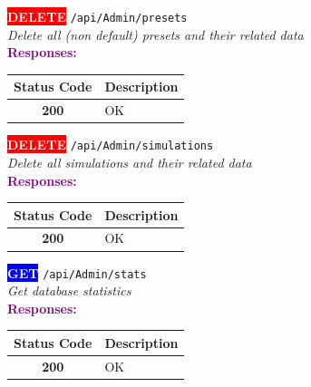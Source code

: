 \begin{tcolorbox}[
    colback=red!5,
    colframe=red,
    arc=2mm,
    boxrule=1pt,
    left=5pt,
    right=5pt,
    top=5pt,
    bottom=5pt
]
\noindent\colorbox{red}{\textcolor{white}{\textbf{DELETE}}} 
\texttt{\large /api/Admin/presets}\\[0.3em]
\textit{Delete all (non default) presets and their related data}\\[0.3em]
\vspace{0.3em}
\textbf{\textcolor{purple}{Responses:}}\\[0.2em]
\begin{tabular}{|c|p{10cm}|}
\hline
\rowcolor{gray!20}
\textbf{Status Code} & \textbf{Description} \\ \hline
\colorbox{green!20}{\textbf{200}} & OK \\ \hline
\end{tabular}
\end{tcolorbox}
\vspace{0.5em}

\begin{tcolorbox}[
    colback=red!5,
    colframe=red,
    arc=2mm,
    boxrule=1pt,
    left=5pt,
    right=5pt,
    top=5pt,
    bottom=5pt
]
\noindent\colorbox{red}{\textcolor{white}{\textbf{DELETE}}} 
\texttt{\large /api/Admin/simulations}\\[0.3em]
\textit{Delete all simulations and their related data}\\[0.3em]
\vspace{0.3em}
\textbf{\textcolor{purple}{Responses:}}\\[0.2em]
\begin{tabular}{|c|p{10cm}|}
\hline
\rowcolor{gray!20}
\textbf{Status Code} & \textbf{Description} \\ \hline
\colorbox{green!20}{\textbf{200}} & OK \\ \hline
\end{tabular}
\end{tcolorbox}
\vspace{0.5em}

\begin{tcolorbox}[
    colback=blue!5,
    colframe=blue,
    arc=2mm,
    boxrule=1pt,
    left=5pt,
    right=5pt,
    top=5pt,
    bottom=5pt
]
\noindent\colorbox{blue}{\textcolor{white}{\textbf{GET}}} 
\texttt{\large /api/Admin/stats}\\[0.3em]
\textit{Get database statistics}\\[0.3em]
\vspace{0.3em}
\textbf{\textcolor{purple}{Responses:}}\\[0.2em]
\begin{tabular}{|c|p{10cm}|}
\hline
\rowcolor{gray!20}
\textbf{Status Code} & \textbf{Description} \\ \hline
\colorbox{green!20}{\textbf{200}} & OK \\ \hline
\end{tabular}
\end{tcolorbox}
\vspace{0.5em}

